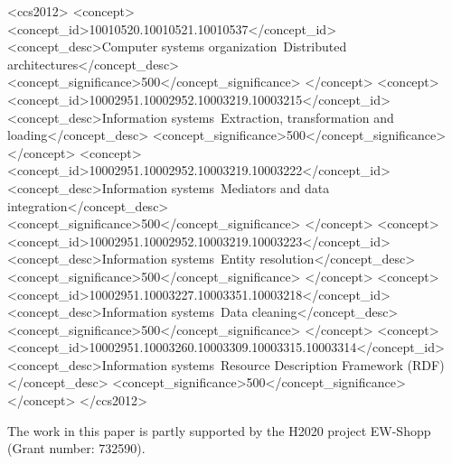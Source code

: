 \documentclass[sigconf,final]{acmart}
\begin{document}
%
%
\begin{CCSXML}
<ccs2012>
  <concept>
    <concept_id>10010520.10010521.10010537</concept_id>
    <concept_desc>Computer systems organization~Distributed architectures</concept_desc>
    <concept_significance>500</concept_significance>
  </concept>
  <concept>
    <concept_id>10002951.10002952.10003219.10003215</concept_id>
    <concept_desc>Information systems~Extraction, transformation and loading</concept_desc>
    <concept_significance>500</concept_significance>
  </concept>
  <concept>
    <concept_id>10002951.10002952.10003219.10003222</concept_id>
    <concept_desc>Information systems~Mediators and data integration</concept_desc>
    <concept_significance>500</concept_significance>
  </concept>
  <concept>
    <concept_id>10002951.10002952.10003219.10003223</concept_id>
    <concept_desc>Information systems~Entity resolution</concept_desc>
    <concept_significance>500</concept_significance>
  </concept>
  <concept>
    <concept_id>10002951.10003227.10003351.10003218</concept_id>
    <concept_desc>Information systems~Data cleaning</concept_desc>
    <concept_significance>500</concept_significance>
  </concept>
  <concept>
    <concept_id>10002951.10003260.10003309.10003315.10003314</concept_id>
    <concept_desc>Information systems~Resource Description Framework (RDF)</concept_desc>
    <concept_significance>500</concept_significance>
  </concept>
</ccs2012>
\end{CCSXML}





\maketitle





%


\begin{acks}
The work in this paper is partly supported by the H2020 project EW-Shopp (Grant number: 732590).
\end{acks}




\end{document}
